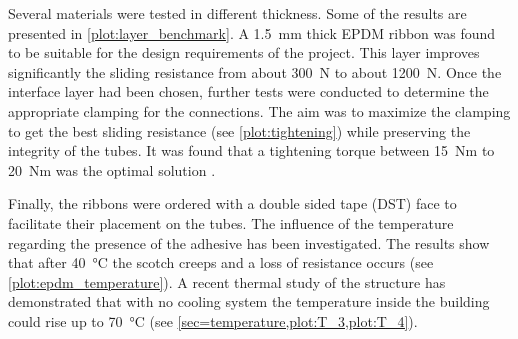 
Several materials were tested in different thickness. Some of the results are presented in \cref{plot:layer_benchmark}. A \SI{1.5}{\mm} thick EPDM ribbon was found to be suitable for the design requirements of the project. This layer improves significantly the sliding resistance from about \SI{300}{\newton} to about \SI{1200}{\newton}. Once the interface layer had been chosen, further tests were conducted to determine the appropriate clamping for the connections. The aim was to maximize the clamping to get the best sliding resistance (see \cref{plot:tightening}) while preserving the  integrity of the tubes. It was found that a tightening torque between \SI{15}{Nm} to \SI{20}{Nm} was the optimal solution \cite{Tayeb2015a}.

Finally, the ribbons were ordered with a double sided tape (DST) face to facilitate their placement on the tubes. The influence of the temperature regarding the presence of the adhesive has been investigated. The results show that after \SI{40}{\celsius} the scotch creeps and a loss of resistance occurs (see \cref{plot:epdm_temperature}). A recent thermal study of the structure has demonstrated that with no cooling system the temperature inside the building could rise up to \SI{70}{\celsius} (see \cref{sec=temperature,plot:T_3,plot:T_4}).


